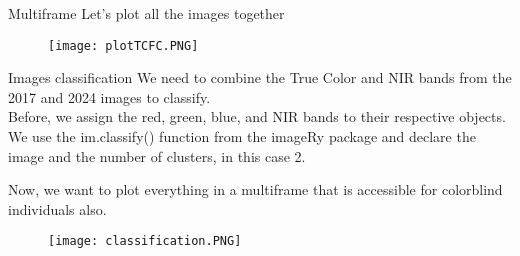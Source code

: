 \documentclass{beamer}
\begin{document}
\begin{frame}{Multiframe}
    Let's plot all the images together

      

\begin{figure}
    \centering
    \texttt{[image: plotTCFC.PNG]}
    \label{fig:enter-label}
\end{figure}
\end{frame}

\begin{frame}{Images classification}
  We need to combine the True Color and NIR bands from the 2017 and 2024 images to classify. \\ Before, we assign the red, green, blue, and NIR bands to their respective objects.
  \\ We use the im.classify() function from the imageRy package and declare the image and the number of clusters, in this case 2.

    

\end{frame}

\begin{frame}{}
Now, we want to plot everything in a multiframe that is accessible for colorblind individuals also.
    
      

\vspace{-0.3cm}
  
    \begin{figure}
        \centering
        \texttt{[image: classification.PNG]}
        \label{fig:enter-label}
    \end{figure}

\end{frame}
\end{document}
